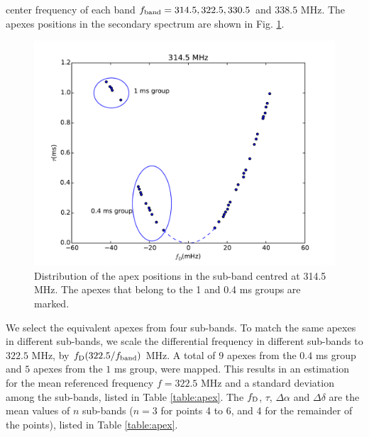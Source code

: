 \documentclass[useAMS,usenatbib]{mn2e}
\begin{document}
center frequency of each band $f_{\rm band}=314.5, 322.5, 330.5$ and $
338.5$ MHz. The apexes positions in the secondary spectrum are shown
in Fig. \ref{fig:apex_pos}. 
\begin{figure}
\centering
\includegraphics[width=\linewidth]{apex_pos.pdf}
\caption{Distribution of the apex positions in the sub-band centred at
  314.5 MHz. The apexes that belong to the 1 and 0.4 ms groups are marked.}
\label{fig:apex_pos}
\end{figure}

We select the equivalent apexes from four sub-bands. To match the same apexes in different sub-bands, we scale the differential frequency in different sub-bands to $322.5$ MHz, by $f_{\rm D} (322.5/f_{\rm band})$ MHz. A total of $9$ apexes from the $0.4$ ms group and $5$ apexes from the $1$ ms
group, were mapped. This results in an estimation
for the mean referenced frequency $f=322.5$ MHz and a standard
deviation among the sub-bands, listed in Table
\ref{table:apex}. The $f_{\rm D}$, $\tau$, $\Delta\alpha$ and $\Delta\delta$
are the mean values of $n$ sub-bands
($n=3$ for points 4 to 6, and 4 for the remainder of the points), listed
in Table \ref{table:apex}. 
\end{document}
